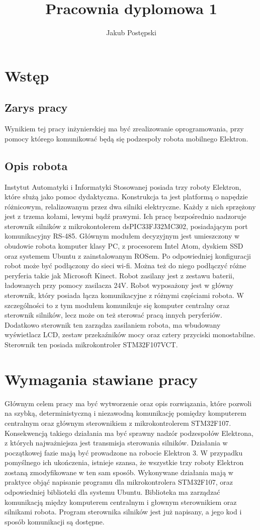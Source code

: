\documentclass[10pt,a4paper]{article}
\author{Jakub Postępski}
\title{Pracownia dyplomowa 1}
\begin{document}
	\maketitle
	\section{Wstęp}
	\subsection{Zarys pracy}
	Wynikiem tej pracy inżynierskiej ma być zrealizowanie oprogramowania, przy pomocy którego komunikować będą się podzespoły robota mobilnego Elektron. 
	\subsection{Opis robota}
	Instytut Automatyki i Informatyki Stosowanej posiada trzy roboty Elektron, które służą jako pomoc dydaktyczna. Konstrukcja ta jest platformą o napędzie różnicowym, relalizowanym przez dwa silniki elektryczne. Każdy z nich sprzężony jest z trzema kołami, lewymi bądź prawymi. Ich pracę bezpośrednio nadzoruje sterownik silników z mikrokontolerem dsPIC33FJ32MC302, posiadającym port komunikacyjny RS-485. Głównym modułem decyzyjnym jest umieszczony w obudowie robota komputer klasy PC, z procesorem Intel Atom, dyskiem SSD oraz systemem Ubuntu z zainstalowanym ROSem. Po odpowiedniej konfiguracji robot może być podłączony do sieci wi-fi. Można też do niego podłączyć różne peryferia takie jak Microsoft Kinect. Robot zasilany jest z zestawu baterii, ładowanych przy pomocy zasilacza 24V. \newline
	Robot wyposażony jest w główny sterownik, który posiada łącza komunikacyjne z różnymi częściami robota. W szczególności to z tym modułem komunikuje się komputer centralny oraz sterownik silników, lecz może on też sterować pracą innych peryferiów. Dodatkowo sterownik ten zarządza zasilaniem robota, ma wbudowany wyświetlacz LCD, zestaw przekaźników mocy oraz cztery przyciski monostabilne. Sterownik ten posiada mikrokontroler STM32F107VCT.	
	\section{Wymagania stawiane pracy}
	Głównym celem pracy ma być wytworzenie oraz opis rozwiązania, które pozwoli na szybką, deterministyczną i niezawodną komunikację pomiędzy komputerem centralnym oraz głównym sterownikiem z mikrokontrolerem STM32F107. Konsekwencją takiego działania ma być sprawny nadzór podzespołów Elektrona, z których najważniejsza jest transmisja sterowania silników. Działania w początkowej fazie mają być prowadzone na robocie Elektron 3. W przypadku pomyślnego ich ukończenia, istnieje szansa, że wszystkie trzy roboty Elektron zostaną zmodyfikowane w ten sam sposób. Wykonywane działania mają w praktyce objąć napisanie programu dla mikrokontrolera STM32F107, oraz odpowiedniej biblioteki dla systemu Ubuntu. Biblioteka ma zarządzać komunikacją między komputerem centralnym i głownym sterownikiem oraz silnikami robota. Program sterownika silników jest już napisany, a jego kod i sposób komunikacji są dostępne.
\end{document}
